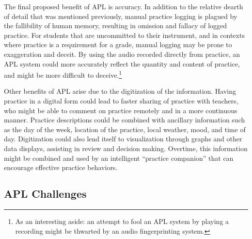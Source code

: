\documentclass{article}
\begin{document}
The final proposed benefit of APL is accuracy. 
In addition to the relative dearth of detail that was mentioned previously, manual practice logging is plagued by the fallibility of human memory, resulting in omission and fallacy of logged practice. For students that are uncommitted to their instrument, and in contexts where practice is a requirement for a grade, manual logging may be prone to exaggeration and deceit. By using the audio recorded directly from practice, an APL system could more accurately reflect the quantity and content of practice, and might be more difficult to deceive.\footnote{As an interesting aside: an attempt to fool an APL system by playing a recording might be thwarted by an audio fingerprinting system.}   


Other benefits of APL arise due to the digitization of the information.
Having practice in a digital form could lead to faster sharing of practice with teachers, who might be able to comment on practice remotely and in a more continuous manner. Practice descriptions could be combined with ancillary information such as the day of the week, location of the practice, local weather, mood, and time of day. Digitization could also lend itself to visualization through graphs and other data displays, assisting in review and decision making. Overtime, this information might be combined and used by an intelligent ``practice companion'' that can encourage effective practice behaviors.  

\subsection{APL Challenges}
\label{sec:challenges}
\end{document}
